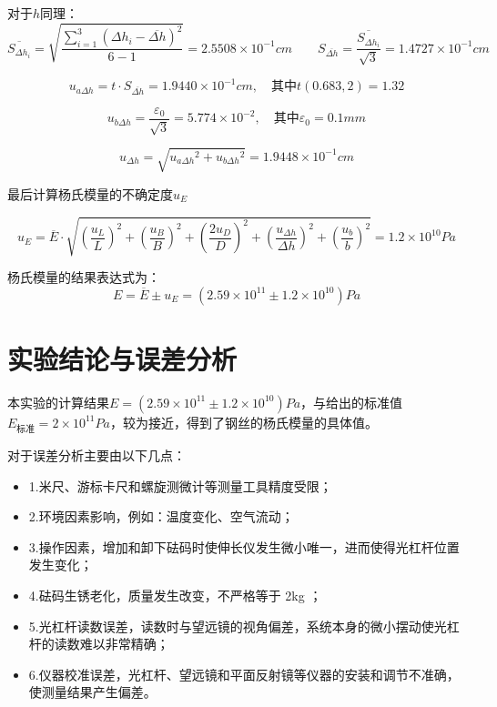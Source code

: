 \documentclass{article}
\begin{document}
对于$h$同理：
$$
\overline{S_{\Delta h_{i}}}=\sqrt{\frac{\sum_{i = 1}^{3}(\Delta h_i-\overline{\Delta h})^2}{6-1}}=2.5508\times10^{-1}cm \qquad S_{\overline{\Delta h}}=\frac{\overline{S_{\Delta h_i}}}{\sqrt{3}}=1.4727\times10^{-1}cm
$$

$$
u_{a\Delta h}=t\cdot S_{\overline{\Delta h}}=1.9440\times10^{-1}cm,\quad 其中t(0.683,2)=1.32
$$

$$
u_{b\Delta h}=\frac{\varepsilon_0}{\sqrt{3}}=5.774\times 10^{-2},\quad 其中\varepsilon_0=0.1mm
$$

$$
u_{\Delta h}=\sqrt{{u_{a\Delta h}}^2+{u_{b \Delta h}}^2}=1.9448\times10^{-1}cm
$$

最后计算杨氏模量的不确定度$u_E$

$$
u_E=\overline{E}\cdot\sqrt{(\frac{u_L}{L})^2+(\frac{u_B}{B})^2+(\frac{2u_D}{D})^2+(\frac{u_{\Delta h}}{\Delta h})^2+(\frac{u_b}{b})^2}=1.2\times{10^{10}} Pa
$$

杨氏模量的结果表达式为：
$$
E=\overline{E}\pm u_E=(2.59\times10^{11}\pm 1.2\times10^{10})Pa
$$

\section{实验结论与误差分析}

本实验的计算结果$E=(2.59\times10^{11}\pm 1.2\times10^{10})Pa$，与给出的标准值$E_{标准}=2\times10^{11}Pa$，较为接近，得到了钢丝的杨氏模量的具体值。

对于误差分析主要由以下几点：

\begin{itemize}
    \item 1.米尺、游标卡尺和螺旋测微计等测量工具精度受限；
    \item 2.环境因素影响，例如：温度变化、空气流动；
    \item 3.操作因素，增加和卸下砝码时使伸长仪发生微小唯一，进而使得光杠杆位置发生变化；
    \item 4.砝码生锈老化，质量发生改变，不严格等于 2kg ；
    \item 5.光杠杆读数误差，读数时与望远镜的视角偏差，系统本身的微小摆动使光杠杆的读数难以非常精确；
    \item 6.仪器校准误差，光杠杆、望远镜和平面反射镜等仪器的安装和调节不准确，使测量结果产生偏差。 
\end{itemize}
\end{document}

